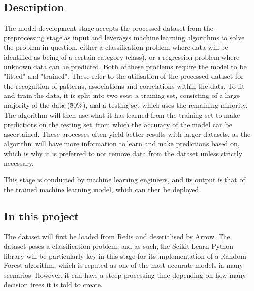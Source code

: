 \documentclass[12pt]{report}
\begin{document}
\subsection{Description}
The model development stage accepts the processed dataset from the preprocessing stage as input and leverages 
machine learning algorithms to solve the problem in question, either a classification problem where 
data will be identified as being of a certain category (class), or a regression problem where unknown 
data can be predicted. Both of these problems require the model to be "fitted" and "trained".
These refer to the utilisation of the processed dataset for the recognition of patterns, 
associations and correlations within the data. To fit and train the data, it is split into two sets:
a training set, consisting of a large majority of the data (\~80\%), and a testing set which uses the 
remaining minority. The algorithm will then use what it has learned from the training set to make predictions 
on the testing set, from which the accuracy of the model can be ascertained. These processes often yield better
results with larger datasets, as the algorithm will have more information to learn and make predictions based on,
which is why it is preferred to not remove data from the dataset unless strictly necessary.

This stage is conducted by machine learning engineers, and its output is that of the trained machine learning 
model, which can then be deployed.

\pagebreak

\subsection{In this project}
The dataset will first be loaded from Redis and deserialised by Arrow. The dataset poses a classification 
problem, and as such, the Scikit-Learn Python library 
will be particularly key in this stage for its implementation of a Random Forest algorithm, which is 
reputed as one of the most accurate models in many scenarios. However, it can have a steep processing
time depending on how many decision trees it is told to create. 
\end{document}
